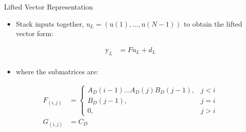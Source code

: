 \documentclass[handout]{beamer}
\newcommand{\boldvec}[1]{\boldsymbol{\mathrm{#1}}}
\let\vec\boldvec
\newcommand{\state}{\vec{y}} %
\newcommand{\sysInput}{\vec{u}} %
\begin{document}
%
\begin{frame}{Lifted Vector Representation}
\begin{itemize}
\item Stack inputs together, $\sysInput_L = (\sysInput(1), \ldots, \sysInput(N-1))$ to obtain the lifted vector form: 
\end{itemize}
\begin{equation*}
\begin{aligned}
\state_L &= F\sysInput_L + d_L \\
\end{aligned}
\end{equation*}

\begin{itemize}
\item where the submatrices are: 
\linebreak
\end{itemize}
\begin{equation*}
\begin{aligned}
F_{(i,j)} &= \left \{
\begin{array}{cc}
A_{D}(i-1)\ldots A_{D}(j)B_{D}(j-1), & j < i \\ 
B_{D}(j-1), & j = i \\
0, & j > i 
\end{array} \right. \\
G_{(i,j)} &= C_{D}
\end{aligned}
\end{equation*}
\end{frame}
%

%
\end{document}
